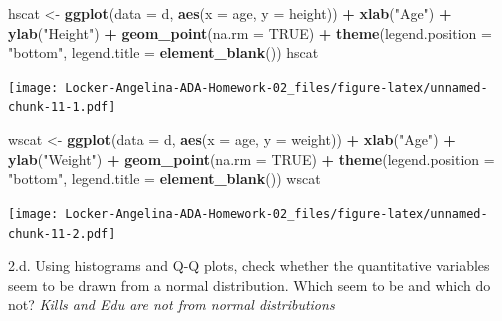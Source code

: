 \documentclass[]{article}
\newenvironment{Shaded}{\begin{snugshade}}{\end{snugshade}}
\newcommand{\KeywordTok}[1]{\textcolor[rgb]{0.13,0.29,0.53}{\textbf{#1}}}
\newcommand{\DataTypeTok}[1]{\textcolor[rgb]{0.13,0.29,0.53}{#1}}
\newcommand{\StringTok}[1]{\textcolor[rgb]{0.31,0.60,0.02}{#1}}
\newcommand{\OtherTok}[1]{\textcolor[rgb]{0.56,0.35,0.01}{#1}}
\newcommand{\OperatorTok}[1]{\textcolor[rgb]{0.81,0.36,0.00}{\textbf{#1}}}
\newcommand{\NormalTok}[1]{#1}
\begin{document}
\begin{Shaded}
\begin{Highlighting}[]
\NormalTok{hscat <-}\StringTok{ }\KeywordTok{ggplot}\NormalTok{(}\DataTypeTok{data =}\NormalTok{ d, }\KeywordTok{aes}\NormalTok{(}\DataTypeTok{x =}\NormalTok{ age, }\DataTypeTok{y =}\NormalTok{ height)) }\OperatorTok{+}\StringTok{ }\KeywordTok{xlab}\NormalTok{(}\StringTok{"Age"}\NormalTok{) }\OperatorTok{+}\StringTok{ }\KeywordTok{ylab}\NormalTok{(}\StringTok{"Height"}\NormalTok{) }\OperatorTok{+}\StringTok{ }\KeywordTok{geom_point}\NormalTok{(}\DataTypeTok{na.rm =} \OtherTok{TRUE}\NormalTok{) }\OperatorTok{+}\StringTok{ }\KeywordTok{theme}\NormalTok{(}\DataTypeTok{legend.position =} \StringTok{"bottom"}\NormalTok{, }\DataTypeTok{legend.title =} \KeywordTok{element_blank}\NormalTok{())}
\NormalTok{hscat}
\end{Highlighting}
\end{Shaded}

\texttt{[image: Locker-Angelina-ADA-Homework-02\_files/figure-latex/unnamed-chunk-11-1.pdf]}

\begin{Shaded}
\begin{Highlighting}[]
\NormalTok{wscat <-}\StringTok{ }\KeywordTok{ggplot}\NormalTok{(}\DataTypeTok{data =}\NormalTok{ d, }\KeywordTok{aes}\NormalTok{(}\DataTypeTok{x =}\NormalTok{ age, }\DataTypeTok{y =}\NormalTok{ weight)) }\OperatorTok{+}\StringTok{ }\KeywordTok{xlab}\NormalTok{(}\StringTok{"Age"}\NormalTok{) }\OperatorTok{+}\StringTok{ }\KeywordTok{ylab}\NormalTok{(}\StringTok{"Weight"}\NormalTok{) }\OperatorTok{+}\StringTok{ }\KeywordTok{geom_point}\NormalTok{(}\DataTypeTok{na.rm =} \OtherTok{TRUE}\NormalTok{) }\OperatorTok{+}\StringTok{ }\KeywordTok{theme}\NormalTok{(}\DataTypeTok{legend.position =} \StringTok{"bottom"}\NormalTok{, }\DataTypeTok{legend.title =} \KeywordTok{element_blank}\NormalTok{())}
\NormalTok{wscat}
\end{Highlighting}
\end{Shaded}

\texttt{[image: Locker-Angelina-ADA-Homework-02\_files/figure-latex/unnamed-chunk-11-2.pdf]}

2.d. Using histograms and Q-Q plots, check whether the quantitative
variables seem to be drawn from a normal distribution. Which seem to be
and which do not? \emph{Kills and Edu are not from normal distributions}

\begin{Shaded}
\end{Shaded}
\end{document}
